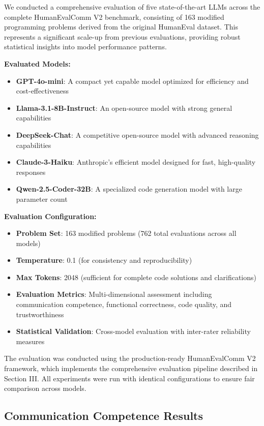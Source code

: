 \documentclass[conference]{IEEEtran}
\begin{document}
We conducted a comprehensive evaluation of five state-of-the-art LLMs across the complete HumanEvalComm V2 benchmark, consisting of 163 modified programming problems derived from the original HumanEval dataset. This represents a significant scale-up from previous evaluations, providing robust statistical insights into model performance patterns.

\textbf{Evaluated Models:}

\begin{itemize}
    \item \textbf{GPT-4o-mini}: A compact yet capable model optimized for efficiency and cost-effectiveness
    \item \textbf{Llama-3.1-8B-Instruct}: An open-source model with strong general capabilities
    \item \textbf{DeepSeek-Chat}: A competitive open-source model with advanced reasoning capabilities
    \item \textbf{Claude-3-Haiku}: Anthropic's efficient model designed for fast, high-quality responses
    \item \textbf{Qwen-2.5-Coder-32B}: A specialized code generation model with large parameter count
\end{itemize}

\textbf{Evaluation Configuration:}

\begin{itemize}
    \item \textbf{Problem Set}: 163 modified problems (762 total evaluations across all models)
    \item \textbf{Temperature}: 0.1 (for consistency and reproducibility)
    \item \textbf{Max Tokens}: 2048 (sufficient for complete code solutions and clarifications)
    \item \textbf{Evaluation Metrics}: Multi-dimensional assessment including communication competence, functional correctness, code quality, and trustworthiness
    \item \textbf{Statistical Validation}: Cross-model evaluation with inter-rater reliability measures
\end{itemize}

The evaluation was conducted using the production-ready HumanEvalComm V2 framework, which implements the comprehensive evaluation pipeline described in Section III. All experiments were run with identical configurations to ensure fair comparison across models.

\subsection{Communication Competence Results}
\end{document}
